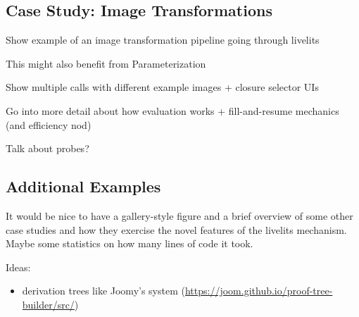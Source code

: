 \subsection{Case Study: Image Transformations}\label{sec:image-transformation}
Show example of an image transformation pipeline going through livelits

This might also benefit from Parameterization

Show multiple calls with different example images + closure selector UIs

Go into more detail about how evaluation works + fill-and-resume mechanics (and efficiency nod)

Talk about probes?

\subsection{Additional Examples}\label{sec:additional-examples}
It would be nice to have a gallery-style figure and a brief overview of some other case studies
and how they exercise the novel features of the livelits mechanism. Maybe some statistics on how
many lines of code it took.

Ideas:
\begin{itemize}
  \item derivation trees like Joomy's system (\url{https://joom.github.io/proof-tree-builder/src/})
\end{itemize}
